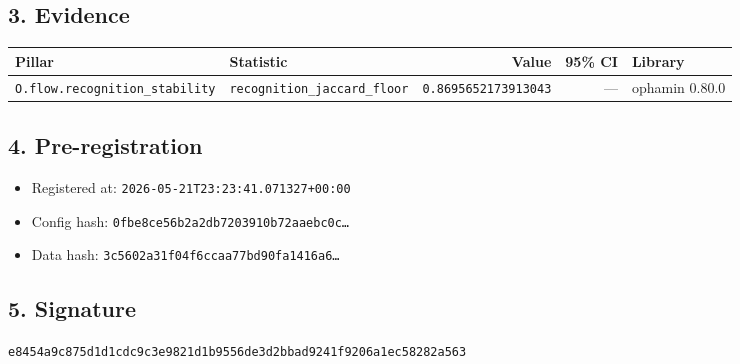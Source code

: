\documentclass{article}
\begin{document}
\subsection*{3. Evidence}
\begin{tabular}{llrrl}\toprule
\textbf{Pillar} & \textbf{Statistic} & \textbf{Value} & \textbf{95\% CI} & \textbf{Library} \\\midrule
\texttt{O.flow.recognition\_stability} & \texttt{recognition\_jaccard\_floor} & \texttt{0.8695652173913043} & --- & ophamin 0.80.0 \\
\bottomrule\end{tabular}
\subsection*{4. Pre-registration}
\begin{itemize}
\item Registered at: \texttt{2026-05-21T23:23:41.071327+00:00}
\item Config hash: \texttt{0fbe8ce56b2a2db7203910b72aaebc0c\dots}
\item Data hash: \texttt{3c5602a31f04f6ccaa77bd90fa1416a6\dots}
\end{itemize}
\subsection*{5. Signature}
\texttt{e8454a9c875d1d1cdc9c3e9821d1b9556de3d2bbad9241f9206a1ec58282a563}\\
\end{document}
